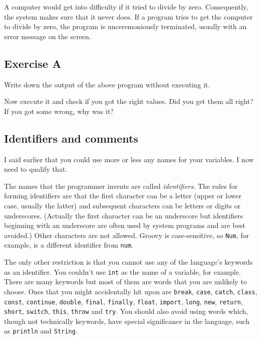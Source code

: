 
A computer would get into difficulty if it tried to divide by zero.
Consequently, the system makes sure that it never does.
If a program tries to get the computer to divide by zero, the program
is unceremoniously terminated, usually with an error message on the
screen.

\subsection*{Exercise A}

Write down the output of the above program without executing it.


Now execute it and check if you got the right values. Did you get them
all right? If you got some wrong, why was it?


\subsection{Identifiers and comments}

I said earlier that you could use more or less any names for your variables.
I now need to qualify that.

The names that the programmer invents are called \emph{identifiers}.  The
rules for forming identifiers are that the first character can be a letter
(upper or lower case, usually the latter) and subsequent characters
can be letters or digits 
or underscores.  (Actually the first character can be an underscore but
identifiers beginning with an underscore are often used by system programs
and are best avoided.)  Other characters are not allowed.  Groovy is
case-sensitive, so \verb!Num!, for example, is a different identifier from
 \verb!num!.

The only other restriction is that you cannot use any of the language's keywords
as an identifier.  You couldn't use \verb!int! as the name of a variable,
for example. There are many keywords but most of them are words that you
are unlikely to choose. 
Ones that you might accidentally hit upon are \texttt{break},
\texttt{case}, \texttt{catch}, \texttt{class}, \texttt{const},
\texttt{continue}, \texttt{double}, \texttt{final}, \texttt{finally},
\texttt{float}, \texttt{import}, \texttt{long}, \texttt{new},
\texttt{return}, \texttt{short}, \texttt{switch}, \texttt{this},
\texttt{throw}  and \texttt{try}. You should also avoid 
using words which, though not technically keywords, have special significance
in the language, such as \verb!println! and \verb!String!.

